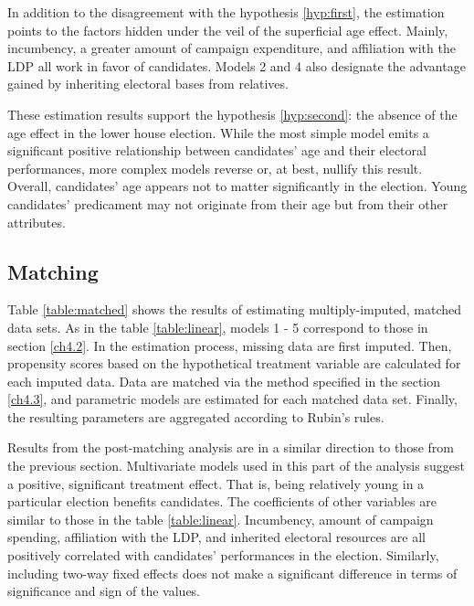 \documentclass[a4paper, 12pt]{article}\usepackage[dvipdfmx]{graphicx}\usepackage[]{xcolor}
\begin{document}
In addition to the disagreement with the hypothesis \ref{hyp:first}, the estimation points to the factors hidden under the veil of the superficial age effect. Mainly, incumbency, a greater amount of campaign expenditure, and affiliation with the LDP all work in favor of candidates. Models 2 and 4 also designate the advantage gained by inheriting electoral bases from relatives.

These estimation results support the hypothesis \ref{hyp:second}: the absence of the age effect in the lower house election. While the most simple model emits a significant positive relationship between candidates' age and their electoral performances, more complex models reverse or, at best, nullify this result. Overall, candidates' age appears not to matter significantly in the election. Young candidates' predicament may not originate from their age but from their other attributes. 

\subsection{Matching} \label{ch5.2}

Table \ref{table:matched} shows the results of estimating multiply-imputed, matched data sets. As in the table \ref{table:linear}, models 1 - 5 correspond to those in section \ref{ch4.2}. In the estimation process, missing data are first imputed. Then, propensity scores based on the hypothetical treatment variable are calculated for each imputed data. Data are matched via the method specified in the section \ref{ch4.3}, and parametric models are estimated for each matched data set. Finally, the resulting parameters are aggregated according to Rubin's rules. 



Results from the post-matching analysis are in a similar direction to those from the previous section. Multivariate models used in this part of the analysis suggest a positive, significant treatment effect. That is, being relatively young in a particular election benefits candidates. The coefficients of other variables are similar to those in the table \ref{table:linear}. Incumbency, amount of campaign spending, affiliation with the LDP, and inherited electoral resources are all positively correlated with candidates' performances in the election. Similarly, including two-way fixed effects does not make a significant difference in terms of significance and sign of the values. 
\end{document}
